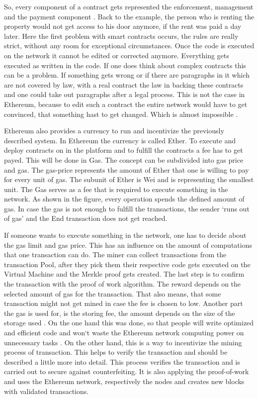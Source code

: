So, every component of a contract gets represented the enforcement, management and the payment component \cite{Dannen2017IES3103305}.
Back to the example, the person who is renting the property would not get access to his door anymore, if the rent was paid a day later. 
Here the first problem with smart contracts occurs, the rules are really strict, without any room for exceptional circumstances. 
Once the code is executed on the network it cannot be edited or corrected anymore. 
Everything gets executed as written in the code. 
If one does think about complex contracts this can be a problem.
If something gets wrong or if there are paragraphs in it which are not covered by law, with a real contract the law in backing these contracts and one could take out paragraphs after a legal process.
This is not the case in Ethereum, because to edit such a contract the entire network would have to get convinced, that something hast to get changed. Which is almost impossible \cite{Dannen2017IES3103305}.

Ethereum also provides a currency to run and incentivize the previously described system. 
In Ethereum the currency is called Ether. 
To execute and deploy contracts on in the platform and to fulfill the contracts a fee has to get payed.
This will be done in Gas. The concept can be subdivided into gas price and gas. 
The gas-price represents the amount of Ether that one is willing to pay for every unit of gas. 
The subunit of Ether is Wei and is representing the smallest unit. 
The Gas serves as a fee that is required to execute something in the network. 
As shown in the figure, every operation spends the defined amount of gas. 
In case the gas is not enough to fulfill the transactions, the sender ‘runs out of gas’ and the End transaction does not get reached. 


If someone wants to execute something in the network, one has to decide about the gas limit and gas price. 
This has an influence on the amount of computations that one transaction can do.
The miner can collect transactions from the transaction Pool, after they pick them their respective code gets executed on the Virtual Machine and the Merkle proof gets created. 
The last step is to confirm the transaction with the proof of work algorithm. 
The reward depends on the selected amount of gas for the transaction. 
That also means, that some transaction might not get mined in case the fee is chosen to low. Another part the gas is used for, is the storing fee, the amount depends on the size of the storage used \cite{preethi}.
On the one hand this was done, so that people will write optimized and efficient code and won`t waste the Ethereum network computing power on unnecessary tasks \cite{preethi, Dannen2017IES3103305}.
On the other hand, this is a way to incentivize the mining process of transaction. 
This helps to verify the transaction and should be described a little more into detail. 
This process verifies the transaction and is carried out to secure against counterfeiting. 
It is also applying the proof-of-work and uses the Ethereum network, respectively the nodes and creates new blocks with validated transactions. 

